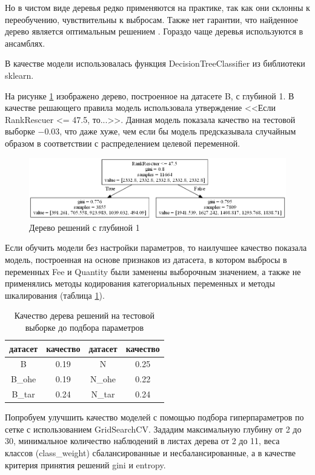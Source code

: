 \documentclass[14pt]{mmcs_article}
\begin{document}
Но в чистом виде деревья редко применяются на практике, так как они склонны к переобучению, чувствительны к выбросам. Также нет гарантии, что найденное дерево является оптимальным решением \cite{lib:trees}. Гораздо чаще деревья используются в ансамблях.

В качестве модели использовалась функция DecisionTreeClassifier из библиотеки sklearn.

На рисунке \ref{models:tree} изображено дерево, построенное на датасете B, с глубиной 1. В качестве решающего правила модель использовала утверждение <<Если RankRescuer <= 47.5, то...>>. Данная модель показала качество на тестовой выборке $-0.03$, что даже хуже, чем если бы модель предсказывала случайным образом в соответствии с распределением целевой переменной.

\begin{figure}[H]
	\centering
	\includegraphics[scale=0.67]{tree.png}
	\caption{Дерево решений с глубиной 1}\label{models:tree}
\end{figure}

Если обучить модели без настройки параметров, то наилучшее качество показала модель, построенная на основе признаков из датасета, в котором выбросы в переменных Fee и Quantity были заменены выборочным значением, а также не применялись методы кодирования категориальных переменных и методы шкалирования (таблица \ref{models:table1}).

\begin{table}[H]
	\centering
	\caption{Качество дерева решений на тестовой выборке до подбора параметров}\label{models:table1}
	\begin{tabular}{cccc}
		\hline
		датасет & качество	& датасет & качество \\
		\hline
		B &	0.19 &	N &	0.25\\
		B\_ohe &	0.19 &	N\_ohe &	0.22\\
		B\_tar &	0.24 &	N\_tar &	0.24\\
		\hline
	\end{tabular}
\end{table}

Попробуем улучшить качество моделей с помощью подбора гиперпараметров по сетке с использованием GridSearchCV. Зададим максимальную глубину от 2 до 30, минимальное количество наблюдений в листах дерева от 2 до 11, веса классов (class\_weight) сбалансированные и несбалансированные, а в качестве критерия принятия решений gini и entropy.
\end{document}
